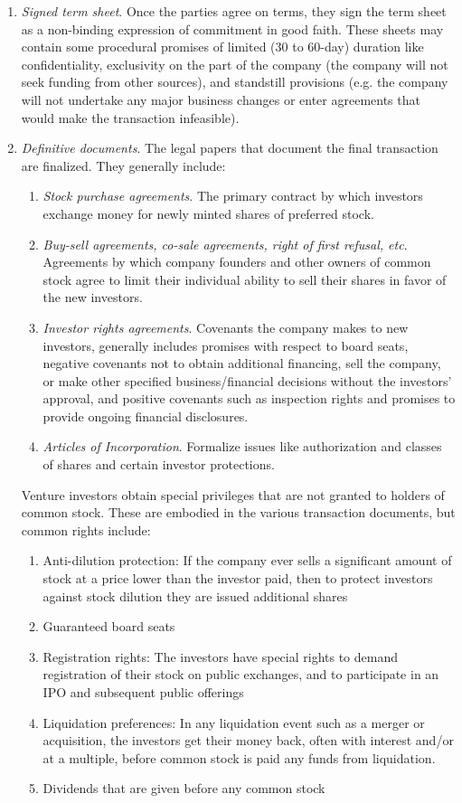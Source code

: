 \documentclass{article}
\begin{document}
\begin{enumerate}
      \item \textit{Signed term sheet}. Once the parties agree on terms, they sign the term sheet as a non-binding expression of commitment in good faith. These sheets may contain some procedural promises of limited (30 to 60-day) duration like confidentiality, exclusivity on the part of the company (the company will not seek funding from other sources), and standstill provisions (e.g. the company will not undertake any major business changes or enter agreements that would make the transaction infeasible). 
      \item \textit{Definitive documents}. The legal papers that document the final transaction are finalized. They generally include: 
      \begin{enumerate}
        \item \textit{Stock purchase agreements}. The primary contract by which investors exchange money for newly minted shares of preferred stock. 
        \item \textit{Buy-sell agreements, co-sale agreements, right of first refusal, etc}. Agreements by which company founders and other owners of common stock agree to limit their individual ability to sell their shares in favor of the new investors. 
        \item \textit{Investor rights agreements}. Covenants the company makes to new investors, generally includes promises with respect to board seats, negative covenants not to obtain additional financing, sell the company, or make other specified business/financial decisions without the investors' approval, and positive covenants such as inspection rights and promises to provide ongoing financial disclosures. 
        \item \textit{Articles of Incorporation}. Formalize issues like authorization and classes of shares and certain investor protections. 
      \end{enumerate}
      Venture investors obtain special privileges that are not granted to holders of common stock. These are embodied in the various transaction documents, but common rights include: 
      \begin{enumerate}
        \item Anti-dilution protection: If the company ever sells a significant amount of stock at a price lower than the investor paid, then to protect investors against stock dilution they are issued additional shares
        \item Guaranteed board seats
        \item Registration rights: The investors have special rights to demand registration of their stock on public exchanges, and to participate in an IPO and subsequent public offerings
        \item Liquidation preferences: In any liquidation event such as a merger or acquisition, the investors get their money back, often with interest and/or at a multiple, before common stock is paid any funds from liquidation.
        \item Dividends that are given before any common stock
      \end{enumerate}


\end{enumerate}
\end{document}
